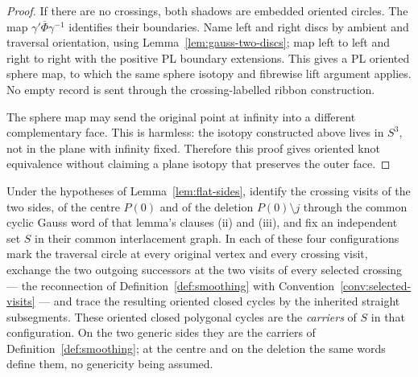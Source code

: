 \begin{proof}
If there are no crossings, both shadows are embedded oriented circles.
The map $\gamma'\overline\Phi\gamma^{-1}$ identifies their boundaries.
Name left and right discs by ambient and traversal orientation, using
Lemma~\ref{lem:gauss-two-discs}; map left to left and right to right with the
positive PL boundary extensions. This gives a PL oriented sphere map,
to which the same sphere isotopy and fibrewise lift argument applies.
No empty record is sent through the crossing-labelled ribbon construction.

The sphere map may send the original point at infinity into a different
complementary face. This is harmless: the isotopy constructed above lives
in $S^3$, not in the plane with infinity fixed. Therefore this proof gives
oriented knot equivalence without claiming a plane isotopy that preserves
the outer face.
\end{proof}


\begin{definition}\label{def:flat-carriers}
Under the hypotheses of Lemma~\ref{lem:flat-sides}, identify the crossing
visits of the two sides, of the centre $P(0)$ and of the deletion
$P(0)\setminus j$ through the common cyclic Gauss word of that lemma's
clauses (ii) and (iii), and fix an independent set $S$ in their common
interlacement graph. In each of these four configurations mark the
traversal circle at every original vertex and every crossing visit,
exchange the two outgoing successors at the two visits of every selected
crossing --- the reconnection of Definition~\ref{def:smoothing} with
Convention~\ref{conv:selected-visits} --- and trace the resulting oriented
closed cycles by the inherited straight subsegments. These oriented closed
polygonal cycles are the \emph{carriers} of $S$ in that configuration. On
the two generic sides they are the carriers of
Definition~\ref{def:smoothing}; at the centre and on the deletion the same
words define them, no genericity being assumed.
\end{definition}


